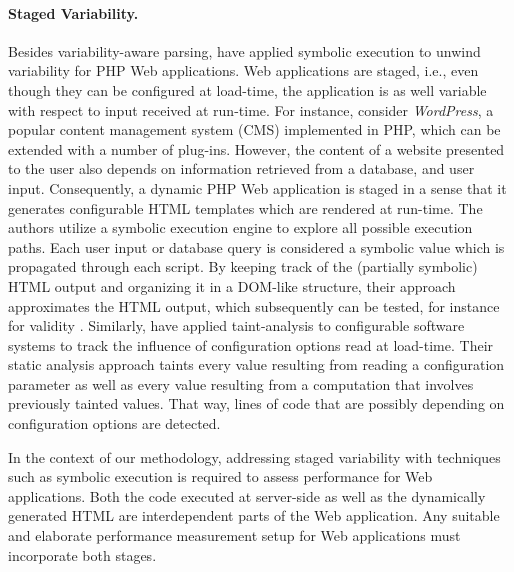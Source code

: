 \paragraph{Staged Variability.} Besides variability-aware parsing,
\cite{nguyen_building_2014} have applied symbolic execution
\citep{king_symbolic_1976,darringer_applications_1978} to unwind variability for
PHP Web applications. Web applications are staged, i.e., even though they can be
configured at load-time, the application is as well variable with respect to
input received at run-time. For instance, consider \emph{WordPress}, a popular
content management system (CMS) implemented in PHP, which can be extended with a number
of plug-ins. However, the content of a website presented to the user also depends
on information retrieved from a database, and user input. Consequently, a
dynamic PHP Web application is staged in a sense that it generates configurable
HTML templates which are rendered at run-time. The authors utilize a symbolic
execution engine to explore all possible execution paths. Each user input or
database query is considered a symbolic value which is propagated through each script.
By keeping track of the (partially symbolic) HTML output and organizing it in a
DOM-like structure, their approach approximates the HTML output, which
subsequently can be tested, for instance for validity
\citep{nguyen_auto-locating_2011}.
Similarly, \cite{lillack_tracking_2014} have applied taint-analysis to configurable software
systems to track the influence of configuration options read at load-time.
Their static analysis approach taints every value resulting from reading a
configuration parameter as well as every value resulting from a computation
that involves previously tainted values. That way, lines of code that are
possibly depending on configuration options are detected.

In the context of our methodology, addressing staged variability with techniques
such as symbolic execution is required to assess performance for Web
applications. Both the code executed at server-side as well as the dynamically
generated HTML are interdependent parts of the Web application. Any suitable and
elaborate performance measurement setup for Web applications must incorporate
both stages.

